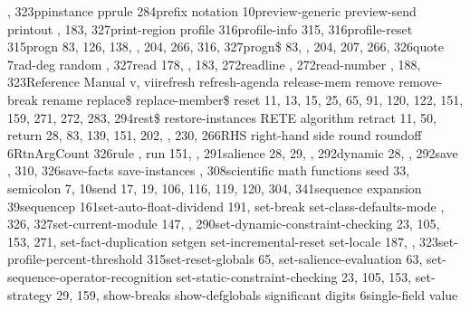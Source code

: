 \documentclass[letterpaper,10pt,english]{sphinxmanual}
\begin{document}
, 323ppinstance pprule 284prefix notation
10preview-generic preview-send printout , 183,
327print-region profile 316profile-info 315, 316profile-reset
315progn 83, 126, 138, , 204, 266, 316, 327progn\$ 83, ,
204, 207, 266, 326quote 7rad-deg random , 327read 178,
, 183, 272readline , 272read-number , 188,
323Reference Manual v, viirefresh refresh-agenda
release-mem remove remove-break
rename replace\$ replace-member\$
reset 11, 13, 15, 25, 65, 91, 120, 122, 151, 159, 271, 272,
283, 294rest\$ restore-instances RETE algorithm
retract 11, 50, return 28, 83, 139, 151, 202, ,
230, 266RHS right-hand side round roundoff
6RtnArgCount 326rule , run 151, , 291salience 28,
29, , 292dynamic 28, , 292save , 310, 326save-facts
save-instances , 308scientific math functions
seed 33, semicolon 7, 10send 17, 19, 106, 116, 119,
120, 304, 341sequence expansion 39sequencep 161set-auto-float-dividend
191, set-break set-class-defaults-mode , 326,
327set-current-module 147, , 290set-dynamic-constraint-checking
23, 105, 153, 271, set-fact-duplication setgen
set-incremental-reset set-locale 187, ,
323set-profile-percent-threshold 315set-reset-globals 65,
set-salience-evaluation 63,
set-sequence-operator-recognition
set-static-constraint-checking 23, 105, 153,
set-strategy 29, 159, show-breaks
show-defglobals significant digits 6single-field value
\end{document}
